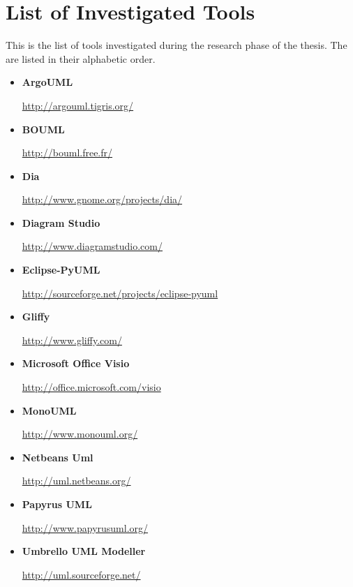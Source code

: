 \chapter{List of Investigated Tools}
\beginchapter
This is the list of tools investigated during the research phase of the thesis. The are listed in their alphabetic order.

\begin{itemize}
\item {\bf ArgoUML}
\par \noindent \url{http://argouml.tigris.org/}

\item {\bf BOUML}
\par \noindent \url{http://bouml.free.fr/}

\item {\bf Dia}
\par \noindent \url{http://www.gnome.org/projects/dia/}

\item {\bf Diagram Studio}
\par \noindent \url{http://www.diagramstudio.com/}

\item {\bf Eclipse-PyUML}
\par \noindent \url{http://sourceforge.net/projects/eclipse-pyuml}

\item {\bf Gliffy}
\par \noindent \url{http://www.gliffy.com/}

\item {\bf Microsoft Office Visio}
\par \noindent \url{http://office.microsoft.com/visio}

\item {\bf MonoUML}
\par \noindent \url{http://www.monouml.org/}

\item {\bf Netbeans Uml}
\par \noindent \url{http://uml.netbeans.org/}

\item {\bf Papyrus UML}
\par \noindent \url{http://www.papyrusuml.org/}

\item {\bf Umbrello UML Modeller}
\par \noindent \url{http://uml.sourceforge.net/}


\end{itemize}

